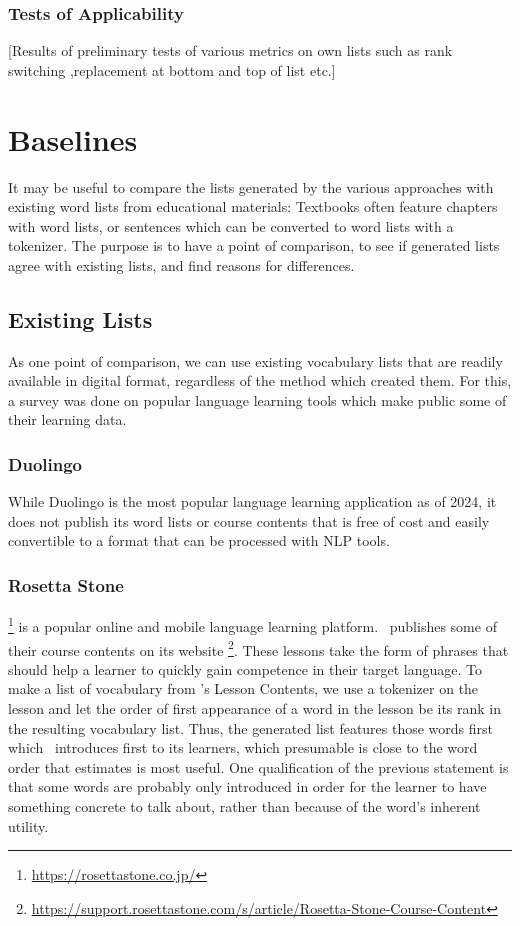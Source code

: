 \subsubsection{Tests of Applicability}
[Results of preliminary tests of various metrics on own lists such as rank switching ,replacement at bottom and top of list etc.]


\section{Baselines}
It may be useful to compare the lists generated by the various approaches with existing word lists from educational materials:
Textbooks often feature chapters with word lists, or sentences which can be converted to word lists with a tokenizer.
The purpose is to have a point of comparison, to see if generated lists agree with existing lists, and find reasons for differences.

\subsection{Existing Lists}
As one point of comparison, we can use existing vocabulary lists that are readily available in digital format, regardless of the method which created them.
For this, a survey was done on popular language learning tools which make public some of their learning data.




\subsubsection{Duolingo}
While Duolingo is the most popular language learning application as of 2024, it does not publish its word lists or course contents that is free of cost and easily convertible to a format that can be processed with NLP tools.

\subsubsection{Rosetta Stone}
\Rosetta \footnote{\url{https://rosettastone.co.jp/}} is a popular online and mobile language learning platform.
\Rosetta\ publishes some of their course contents on its website \footnote{\url{https://support.rosettastone.com/s/article/Rosetta-Stone-Course-Content}}.
These lessons take the form of phrases that should help a learner to quickly gain competence in their target language.
To make a list of vocabulary from \Rosetta 's Lesson Contents, we use a tokenizer on the lesson and let the order of first appearance of a word in the lesson be its rank in the resulting vocabulary list.
Thus, the generated list features those words first which \Rosetta\ introduces first to its learners, which presumable is close to the word order that \Rosetta estimates is most useful.
One qualification of the previous statement is that some words are probably only introduced in order for the learner to have something concrete to talk about, rather than because of the word's inherent utility.



